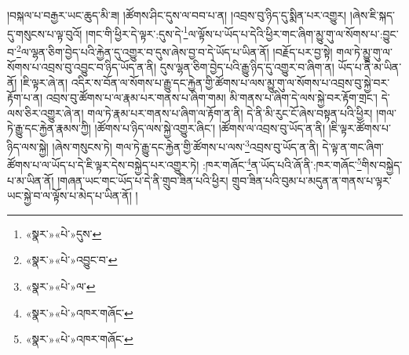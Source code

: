 །བསྐལ་པ་བརྒྱར་ཡང་ཆུད་མི་ཟ། །ཚོགས་ཤིང་དུས་ལ་བབ་པ་ན། །འབྲས་བུ་ཉིད་དུ་སྨིན་པར་འགྱུར། །ཞེས་ཇི་སྐད་དུ་གསུངས་པ་ལྟ་བུའོ། །གང་གི་ཕྱིར་དེ་ལྟར་:དུས་དེ་\footnote{«སྣར་»«པེ་»དུས་}ལ་ལྟོས་པ་ཡོད་པ་དེའི་ཕྱིར་གང་ཞིག་མྱུ་གུ་ལ་སོགས་པ་:བྱུང་བ་\footnote{«སྣར་»«པེ་»འབྱུང་བ་}ལ་ལྷན་ཅིག་བྱེད་པའི་རྐྱེན་དུ་འགྱུར་བ་དུས་ཞེས་བྱ་བ་དེ་ཡོད་པ་ཡིན་ནོ། །བརྗོད་པར་བྱ་སྟེ། གལ་ཏེ་མྱུ་གུ་ལ་སོགས་པ་འབྲས་བུ་འབྱུང་བ་ཉིད་ཡོད་ན་ནི། དུས་ལྷན་ཅིག་བྱེད་པའི་རྒྱུ་ཉིད་དུ་འགྱུར་བ་ཞིག་ན། ཡོད་པ་ནི་མ་ཡིན་ནོ། །ཇི་ལྟར་ཞེ་ན། འདིར་ས་བོན་ལ་སོགས་པ་རྒྱུ་དང་རྐྱེན་གྱི་ཚོགས་པ་ལས་མྱུ་གུ་ལ་སོགས་པ་འབྲས་བུ་སྐྱེ་བར་རྟོག་པ་ན། འབྲས་བུ་ཚོགས་པ་ལ་རྣམ་པར་གནས་པ་ཞིག་གམ། མི་གནས་པ་ཞིག་དེ་ལས་སྐྱེ་བར་རྟོག་གྲང་། དེ་ལས་ཅིར་འགྱུར་ཞེ་ན། གལ་ཏེ་རྣམ་པར་གནས་པ་ཞིག་ལ་རྟོག་ན་ནི། དེ་ནི་མི་རུང་ངོ་ཞེས་བསྟན་པའི་ཕྱིར། །གལ་ཏེ་རྒྱུ་དང་རྐྱེན་རྣམས་ཀྱི། །ཚོགས་པ་ཉིད་ལས་སྐྱེ་འགྱུར་ཞིང་། །ཚོགས་ལ་འབྲས་བུ་ཡོད་ན་ནི། །ཇི་ལྟར་ཚོགས་པ་ཉིད་ལས་སྐྱེ། །ཞེས་གསུངས་ཏེ། གལ་ཏེ་རྒྱུ་དང་རྐྱེན་གྱི་ཚོགས་པ་ལས་\footnote{«སྣར་»«པེ་»ལ་}འབྲས་བུ་ཡོད་ན་ནི། དེ་ལྟ་ན་གང་ཞིག་ཚོགས་པ་ལ་ཡོད་པ་དེ་ཇི་ལྟར་དེས་བསྐྱེད་པར་འགྱུར་ཏེ། :ཁར་གཞོང་\footnote{«སྣར་»«པེ་»འཁར་གཞོང་}ན་ཡོད་པའི་ཞོ་ནི་:ཁར་གཞོང་\footnote{«སྣར་»«པེ་»འཁར་གཞོང་}གིས་བསྐྱེད་པ་མ་ཡིན་ནོ། །གཞན་ཡང་གང་ཡོད་པ་དེ་ནི་གྲུབ་ཟིན་པའི་ཕྱིར། གྲུབ་ཟིན་པའི་བུམ་པ་མདུན་ན་གནས་པ་ལྟར་ཡང་སྐྱེ་བ་ལ་ལྟོས་པ་མེད་པ་ཡིན་ནོ། །
